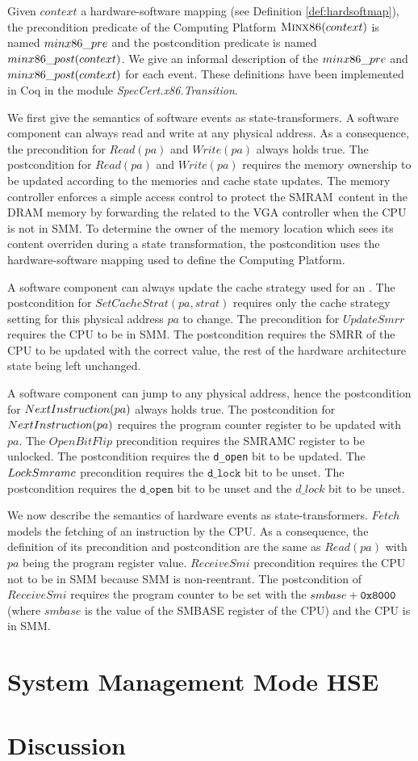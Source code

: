 \label{page:minx86def} Given $context$ a hardware-software mapping (see
Definition \ref{def:hardsoftmap}), the precondition predicate of the Computing
Platform $\textsc{Minx86}(context)$ is named $min\-x86\_pre$ and the
postcondition predicate is named $min\-x86\_post(con\-text)$. We give an
informal description of the $min\-x86\_pre$ and $minx\-86\_post(context)$ for
each event. These definitions have been implemented in Coq in the module
\emph{Spec\-Cert.x86.Transi\-tion}.

We first give the semantics of software events as state-transformers. A software
component can always read and write at any physical address. As a consequence,
the precondition for $Read(pa)$ and $Write(pa)$ always holds true. The
postcondition for $Read(pa)$ and $Write(pa)$ requires the memory ownership to be
updated according to the memories and cache state updates. The memory controller
enforces a simple access control to protect the SMRAM content in the DRAM memory
by forwarding the related \IO to the VGA controller when the CPU is not in SMM.
To determine the owner of the memory location which sees its content overriden
during a state transformation, the postcondition uses the hardware-software
mapping used to define the Computing Platform.

A software component can always update the cache strategy used for an \IO. The
postcondition for $SetCacheStrat(pa,strat)$ requires only the cache strategy
setting for this physical address $pa$ to change. The precondition for
$UpdateSmrr$ requires the CPU to be in SMM. The postcondition requires the SMRR
of the CPU to be updated with the correct value, the rest of the hardware
architecture state being left unchanged.

A software component can jump to any physical address, hence the postcondition
for $NextInstru\-ction(pa)$ always holds true. The postcondition for
$NextInstru\-ction(pa)$ requires the program counter register to be updated with
$pa$. The $OpenBitFlip$ precondition requires the SMRAMC register to be
unlocked. The postcondition requires the \texttt{d\_open} bit to be updated. The
$Lock\-Smramc$ precondition requires the $\texttt{d\_lock}$ bit to be unset. The
postcondition requires the $\texttt{d\_open}$ bit to be unset and the $d\_lock$
bit to be unset.

We now describe the semantics of hardware events as state-transformers. $Fetch$
models the fetching of an instruction by the CPU. As a consequence, the
definition of its precondition and postcondition are the same as $Read(pa)$ with
$pa$ being the program register value.  $ReceiveSmi$ precondition requires the
CPU not to be in SMM because SMM is non-reentrant.  The postcondition of
$ReceiveSmi$ requires the program counter to be set with the $smbase +
\mathtt{0x8000}$ (where $smbase$ is the value of the SMBASE register of the CPU)
and the CPU is in SMM.

\section{System Management Mode HSE} \label{sec:speccert:smm}

\section{Discussion} \label{sec:speccert:discuss}